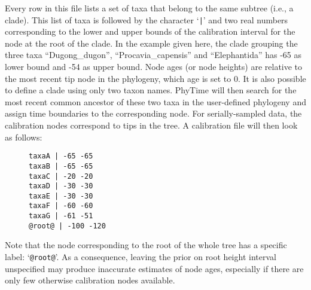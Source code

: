 \documentclass[a4paper,12pt]{article}
\newcommand{\x}[1]{\texttt{#1}}
\begin{document}
\begin{itemize}
Every row in  this file lists a  set of taxa that belong  to the same subtree (i.e.,  a clade). This
list of taxa  is followed by the character  `\x{|}' and two real numbers corresponding  to the lower
and upper bounds of the  calibration interval for the node at the root of  the clade. In the example
given  here,  the  clade  grouping  the three  taxa  ``Dugong\_dugon'',  ``Procavia\_capensis''  and
``Elephantida'' has  -65 as lower  bound and -54  as upper bound.  Node  ages (or node  heights) are
relative to the most recent tip node in the phylogeny, which age is set to 0. It is also possible to
define a  clade using  only two taxon  names. PhyTime will  then search  for the most  recent common
ancestor  of these  two  taxa  in the  user-defined  phylogeny and  assign  time  boundaries to  the
corresponding node. For serially-sampled data, the calibration nodes correspond to tips in the tree.
A calibration file will then look as follows:
\begin{figure}[h]
\begin{small}
\begin{Verbatim}[frame=single, label=Calibration node file (serially-sampled sequences), samepage=true, baselinestretch=0.5]
taxaA | -65 -65
taxaB | -65 -65
taxaC | -20 -20
taxaD | -30 -30
taxaE | -30 -30
taxaF | -60 -60
taxaG | -61 -51
@root@ | -100 -120
\end{Verbatim}
\end{small}
\end{figure}



Note   that  the  node corresponding  to  the  root of  the  whole tree  has  a specific  label:
`\x{@root@}'.  {\color{red}{It is important  to specify upper and lower bounds for  the root node in
order to ensure convergence  of the Gibbs sampler. If the prior interval for  the root height is not
specified, the  upper bound will be set  to the upper bound  of the oldest calibration  node and the
lower bound  will be set to twice  this age.}}  As a  consequence, leaving the prior  on root height
interval unspecified may produce inaccurate estimates of node ages, especially if there are only few
otherwise calibration nodes available.


\end{itemize}
\end{document}
